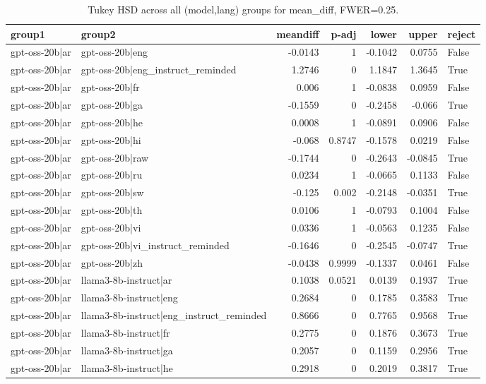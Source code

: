 \begin{table}
\caption{Tukey HSD across all (model,lang) groups for mean_diff, FWER=0.25.}
\label{tab:tukey_all_models_all_langs_mean_diff}
\begin{tabular}{l l r r r r l}
\toprule
group1 & group2 & meandiff & p-adj & lower & upper & reject \\
\midrule
gpt-oss-20b|ar & gpt-oss-20b|eng & -0.0143 & 1 & -0.1042 & 0.0755 & False \\
gpt-oss-20b|ar & gpt-oss-20b|eng_instruct_reminded & 1.2746 & 0 & 1.1847 & 1.3645 & True \\
gpt-oss-20b|ar & gpt-oss-20b|fr & 0.006 & 1 & -0.0838 & 0.0959 & False \\
gpt-oss-20b|ar & gpt-oss-20b|ga & -0.1559 & 0 & -0.2458 & -0.066 & True \\
gpt-oss-20b|ar & gpt-oss-20b|he & 0.0008 & 1 & -0.0891 & 0.0906 & False \\
gpt-oss-20b|ar & gpt-oss-20b|hi & -0.068 & 0.8747 & -0.1578 & 0.0219 & False \\
gpt-oss-20b|ar & gpt-oss-20b|raw & -0.1744 & 0 & -0.2643 & -0.0845 & True \\
gpt-oss-20b|ar & gpt-oss-20b|ru & 0.0234 & 1 & -0.0665 & 0.1133 & False \\
gpt-oss-20b|ar & gpt-oss-20b|sw & -0.125 & 0.002 & -0.2148 & -0.0351 & True \\
gpt-oss-20b|ar & gpt-oss-20b|th & 0.0106 & 1 & -0.0793 & 0.1004 & False \\
gpt-oss-20b|ar & gpt-oss-20b|vi & 0.0336 & 1 & -0.0563 & 0.1235 & False \\
gpt-oss-20b|ar & gpt-oss-20b|vi_instruct_reminded & -0.1646 & 0 & -0.2545 & -0.0747 & True \\
gpt-oss-20b|ar & gpt-oss-20b|zh & -0.0438 & 0.9999 & -0.1337 & 0.0461 & False \\
gpt-oss-20b|ar & llama3-8b-instruct|ar & 0.1038 & 0.0521 & 0.0139 & 0.1937 & True \\
gpt-oss-20b|ar & llama3-8b-instruct|eng & 0.2684 & 0 & 0.1785 & 0.3583 & True \\
gpt-oss-20b|ar & llama3-8b-instruct|eng_instruct_reminded & 0.8666 & 0 & 0.7765 & 0.9568 & True \\
gpt-oss-20b|ar & llama3-8b-instruct|fr & 0.2775 & 0 & 0.1876 & 0.3673 & True \\
gpt-oss-20b|ar & llama3-8b-instruct|ga & 0.2057 & 0 & 0.1159 & 0.2956 & True \\
gpt-oss-20b|ar & llama3-8b-instruct|he & 0.2918 & 0 & 0.2019 & 0.3817 & True \\

\end{tabular}
\end{table}
